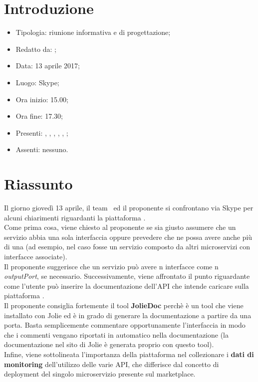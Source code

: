 \section{Introduzione}

	\begin{itemize}
		\item Tipologia: riunione informativa e di progettazione;
		\item Redatto da: \AS;
		\item Data: 13 aprile 2017;
		\item Luogo: Skype;
		\item Ora inizio: 15.00;
		\item Ora fine: 17.30;
		\item Presenti: \AN, \MC, \DAN, \DS, \NS, \AS;	
		\item Assenti: nessuno.
	\end{itemize}

\section{Riassunto}
Il giorno giovedì 13 aprile, il team \gruppo\ ed il proponente si confrontano via Skype per alcuni chiarimenti riguardanti la piattaforma \progetto.\\
Come prima cosa, viene chiesto al proponente se sia giusto assumere che un servizio abbia una sola interfaccia oppure prevedere che ne possa avere anche più di una (ad esempio, nel caso fosse un servizio composto da altri microservizi con interfacce associate).\\
Il proponente suggerisce che un servizio può avere n interfacce come n \textit{outputPort}, se necessario.
Successivamente, viene affrontato il punto riguardante come l'utente può inserire la documentazione dell'API che intende caricare sulla piattaforma \progetto.\\
Il proponente consiglia fortemente il tool \textbf{JolieDoc} perchè è un tool che viene installato con Jolie ed è in grado di generare la documentazione a partire da una porta. Basta semplicemente commentare opportunamente l'interfaccia in modo che i commenti vengano riportati in automatico nella documentazione (la documentazione nel sito di Jolie è generata proprio con questo tool).\\
Infine, viene sottolineata l'importanza della piattaforma nel collezionare i \textbf{dati di monitoring} dell'utilizzo delle varie API, che differisce dal concetto di deployment del singolo microservizio presente sul marketplace.

